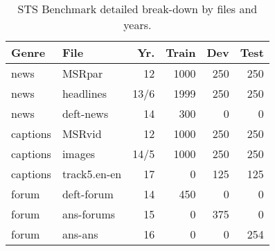 \documentclass[11pt,a4paper]{article}
\begin{document}
\begin{table}[t]
\small
\begin{center}
\begin{tabular}{|l|l|r|r|r|r|} 
\hline
 Genre     &File           &Yr.   &Train  &Dev &Test\\\hline
 news      &MSRpar         &12     &1000  &250  &250\\
 news      &headlines      &13/6  &1999  &250  &250 \\
 news      &deft-news      &14     & 300  &  0  &  0\\
 captions  &MSRvid         &12     &1000  &250  &250\\
 captions  &images         &14/5  &1000  &250  &250\\
 captions  &track5.en-en   &17      &  0  &125  &125\\
 forum     &deft-forum     &14      &450  &  0  &  0\\
 forum     &ans-forums &15      &  0  &375  &  0\\
 forum     &ans-ans  &16      &  0  &  0  &254\\
 \hline
\end{tabular}
\end{center}
\caption{STS Benchmark detailed break-down by files and years.
}
\label{tab:stsbenchmark2}
\end{table}
 
\end{document}

